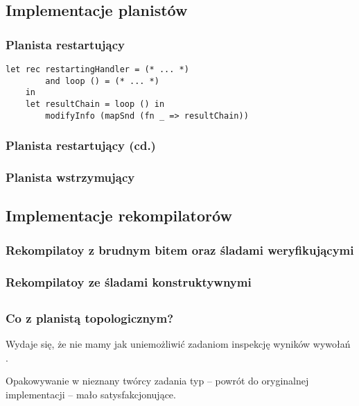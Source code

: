 \subsection{Implementacje planistów}

\begin{frame}[fragile]
  \frametitle{Planista restartujący}
  
  \vspace{-1.25em}
\begin{lstlisting}[style=Haleff-long]
    let rec restartingHandler = (* ... *)
        and loop () = (* ... *)
    in
    let resultChain = loop () in
        modifyInfo (mapSnd (fn _ => resultChain))
\end{lstlisting}
  
\end{frame}

\begin{frame}
  \frametitle{Planista restartujący (cd.)}
  
\end{frame}

\begin{frame}[fragile]
  \frametitle{Planista wstrzymujący}
  
\end{frame}

\subsection{Implementacje rekompilatorów}

\begin{frame}[fragile]
  \frametitle{Rekompilatoy z brudnym bitem oraz śladami weryfikującymi}
  
  
\end{frame}

\begin{frame}[fragile]
  \frametitle{Rekompilatoy ze śladami konstruktywnymi}
  
  
\end{frame}

\subsection{}

\begin{frame}
  \frametitle{Co z planistą topologicznym?}

  Wydaje się, że nie mamy jak uniemożliwić zadaniom inspekcję wyników wywołań .

  \vspace{1em}
  
  Opakowywanie w nieznany twórcy zadania typ -- powrót do oryginalnej implementacji -- mało satysfakcjonujące.
\end{frame}
